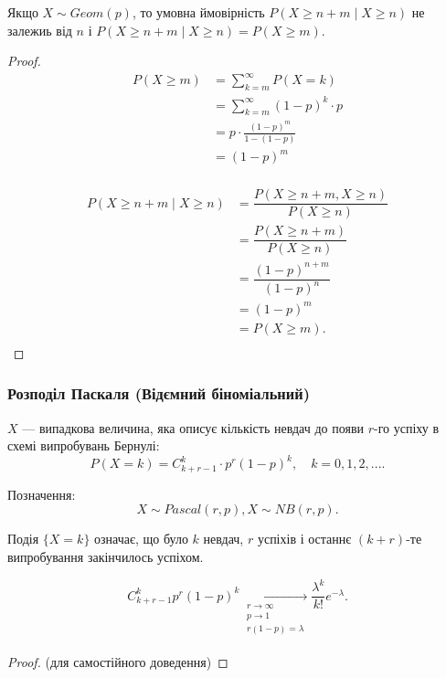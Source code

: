 \begin{claim}
    Якщо $X \sim Geom(p)$, то умовна ймовірність
    $P(X \geqslant n + m \mid X \geqslant n)$ не залежиь
    від $n$ і $P(X \geqslant n + m \mid X \geqslant n) = P(X \geqslant m)$.
\end{claim}
\begin{proof}
    $$\begin{array}{rl}
        P(X \geqslant m ) & = \sum\limits_{k=m}^{\infty} P(X = k) \\
        & = \sum\limits_{k=m}^{\infty} (1-p)^k \cdot p \\
        & = p \cdot \frac{(1-p)^{m}}{1 - (1-p)} \\
        & = (1-p)^m \\
    \end{array}$$

    $$\begin{array}{rl}
        P(X \geqslant n + m \mid X \geqslant n) & =\dfrac{P(X \geqslant n + m, X \geqslant n)}{P(X \geqslant n)} \\
        & = \dfrac{P(X \geqslant n + m)}{P(X \geqslant n)} \\
        & = \dfrac{(1-p)^{n+m}}{(1-p)^n} \\
        & = (1-p)^m \\
        & = P(X \geqslant m). \\
    \end{array}$$
\end{proof}


\subsubsection{Розподіл Паскаля (Відємний біноміальний)}

$X$ --- випадкова величина, яка описує кількість невдач
до появи $r$-го успіху в схемі випробувань Бернулі:
$$P(X = k) = C_{k+r-1}^k \cdot p^r (1-p)^k, \quad k =0, 1, 2, ....$$

Позначення: 
$$X \sim Pascal(r, p), X \sim NB(r, p).$$

Подія $\{X = k\}$ означає, що було $k$ невдач, $r$ успіхів і 
останнє $(k+r)$-те випробування закінчилось успіхом.

\begin{claim}
    $$C_{k+r-1}^{k} p^r (1-p)^k \xrightarrow[\begin{array}{c}
            r \rightarrow \infty \\
            p \rightarrow 1 \\
            r(1-p) = \lambda \\
        \end{array}]{} \frac{\lambda^k}{k!} e^{-\lambda}.$$    
\end{claim}
\begin{proof}
    (для самостійного доведення)
\end{proof}

